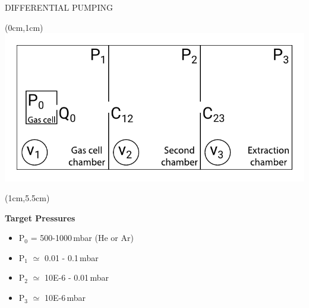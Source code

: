 \documentclass[9pt]{beamer}
\begin{document}
\begin{frame}{DIFFERENTIAL PUMPING}
    \begin{textblock*}{13cm}(0cm,1cm)
            \centering
            \includegraphics[scale=0.7]{assets/simpdiffsect.pdf}
    \end{textblock*}
    
    \begin{textblock*}{5cm}(1cm,5.5cm)
      \centering
      {\textbf{Target Pressures}
      \begin{itemize}
          \item P$_0$ = 500-1000\,mbar (He or Ar)
          \item P$_1$ $\simeq$ 0.01 - 0.1\,mbar
          \item P$_2$ $\simeq$ 10E-6 - 0.01\,mbar
          \item P$_3$ $\simeq$ 10E-6\,mbar
      \end{itemize}}
    \end{textblock*}
    
    \end{frame}
\end{document}
